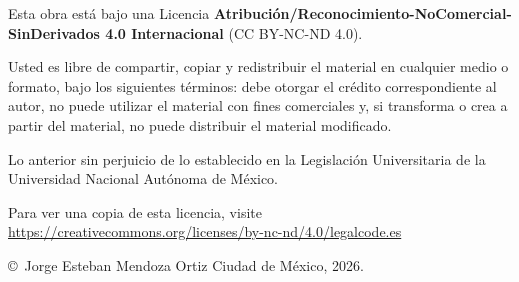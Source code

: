 
\newpage
\thispagestyle{empty}
\vspace*{\fill}
\noindent
\begin{minipage}{0.75\textwidth}
	{\Huge \ccbyncnd}
	
	\vspace{1em}
	
	\small
	Esta obra está bajo una Licencia
	\textbf{Atribución/Reconocimiento-NoComercial-SinDerivados 4.0 Internacional}
	(CC BY-NC-ND 4.0).
	
	\vspace{0.5em}
	
	Usted es libre de compartir, copiar y redistribuir el material en
	cualquier medio o formato, bajo los siguientes términos: debe otorgar
	el crédito correspondiente al autor, no puede utilizar el material con
	fines comerciales y, si transforma o crea a partir del material, no
	puede distribuir el material modificado.
	
	\vspace{0.5em}
	
	Lo anterior sin perjuicio de lo establecido en la Legislación
	Universitaria de la Universidad Nacional Autónoma de México.
	
	\vspace{0.5em}
	
	Para ver una copia de esta licencia, visite\\
	\url{https://creativecommons.org/licenses/by-nc-nd/4.0/legalcode.es}
	
	\vspace{1.5em}
	
	\copyright\ Jorge Esteban Mendoza Ortiz \hfill Ciudad de México, 2026.
\end{minipage}
\vspace*{\fill}
\newpage

